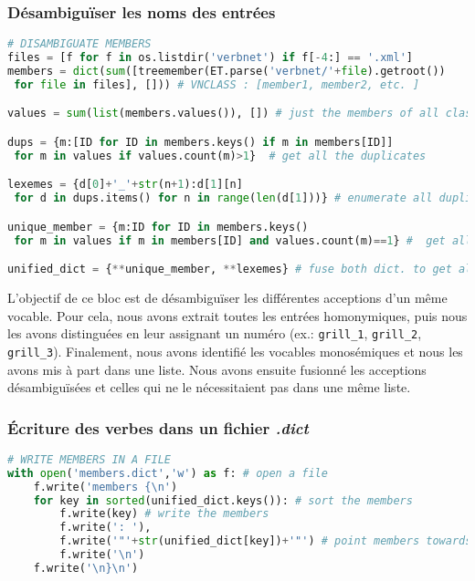 \subsubsection{Désambiguïser les noms des entrées}

\begin{lstlisting}[language=Python, caption = Désambiguïsation des noms des entrées, label=fig:scriptmember-bloc2]
# DISAMBIGUATE MEMBERS
files = [f for f in os.listdir('verbnet') if f[-4:] == '.xml']
members = dict(sum([treemember(ET.parse('verbnet/'+file).getroot())
 for file in files], [])) # VNCLASS : [member1, member2, etc. ]

values = sum(list(members.values()), []) # just the members of all classes

dups = {m:[ID for ID in members.keys() if m in members[ID]]
 for m in values if values.count(m)>1}  # get all the duplicates

lexemes = {d[0]+'_'+str(n+1):d[1][n]
 for d in dups.items() for n in range(len(d[1]))} # enumerate all duplicates: eat_1, eat_2

unique_member = {m:ID for ID in members.keys() 
 for m in values if m in members[ID] and values.count(m)==1} #  get all unique lexemes

unified_dict = {**unique_member, **lexemes} # fuse both dict. to get all members disambiguated
\end{lstlisting}

L'objectif de ce bloc est de désambiguïser les différentes acceptions d'un même vocable. Pour cela, nous avons extrait toutes les entrées homonymiques, puis nous les avons distinguées en leur assignant un numéro (ex.: \texttt{grill\_1}, \texttt{grill\_2}, \texttt{grill\_3}). Finalement, nous avons identifié les vocables monosémiques et nous les avons mis à part dans une liste. Nous avons ensuite fusionné les acceptions désambiguïsées et celles qui ne le nécessitaient pas dans une même liste.

\subsubsection{Écriture des verbes dans un fichier \emph{.dict}}

\begin{lstlisting}[language=Python, caption = Écriture des verbes dans le fichier \emph{members.dict}, label=fig:scriptmember-bloc3]
# WRITE MEMBERS IN A FILE
with open('members.dict','w') as f: # open a file
    f.write('members {\n')
    for key in sorted(unified_dict.keys()): # sort the members
        f.write(key) # write the members
        f.write(': '),
        f.write('"'+str(unified_dict[key])+'"') # point members towards ID of VNCLASS
        f.write('\n')
    f.write('\n}\n')
\end{lstlisting}

